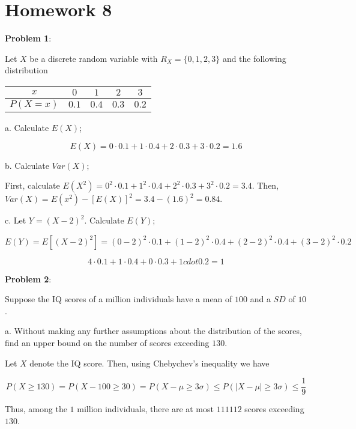 \documentclass{article}
\begin{document}
\section{Homework 8}

\noindent\textbf{Problem 1}:

Let $X$ be a discrete random variable with $R_X=\{0,1,2,3\}$ and the following distribution

\begin{center}
    \begin{tabular}{ |c|c|c|c|c| }
        \hline
        $x$&$0$&$1$&$2$&$3$\\
        \hline
        $P(X=x)$&$0.1$&$0.4$&$0.3$&$0.2$\\
        \hline
    \end{tabular}
\end{center}

\indent\indent a. Calculate $E(X)$;

{\color{blue}

$$E(X)=0\cdot0.1+1\cdot0.4+2\cdot0.3+3\cdot0.2=1.6$$

}

\indent\indent b. Calculate $Var(X)$;

{\color{blue}

First, calculate $E(X^2)=0^2\cdot0.1+1^2\cdot0.4+2^2\cdot0.3+3^2\cdot0.2=3.4$. Then, $Var(X)=E(x^2)-[E(X)]^2=3.4-(1.6)^2=0.84$.

}

\indent\indent c. Let $Y=(X-2)^2$. Calculate $E(Y)$;

{\color{blue}

$$E(Y)=E\left[(X-2)^2\right]=(0-2)^2\cdot0.1+(1-2)^2\cdot0.4+(2-2)^2\cdot0.4+(3-2)^2\cdot0.2$$

$$4\cdot0.1+1\cdot0.4+0\cdot0.3+1cdot0.2=1$$

}

\noindent\textbf{Problem 2}:

Suppose the IQ scores of a million individuals have a mean of $100$ and a $SD$ of $10$. 

\indent\indent a. Without making any further assumptions about the distribution of the scores, find an upper bound on the number of scores exceeding $130$.

{\color{blue}

Let $X$ denote the IQ score. Then, using Chebychev's inequality we have

$$P(X\ge130)=P(X-100\ge30)=P(X-\mu\ge3\sigma)\le P(|X-\mu|\ge3\sigma)\le\frac{1}{9}$$

Thus, among the $1$ million individuals, there are at most $111112$ scores exceeding $130$.

}
\end{document}
